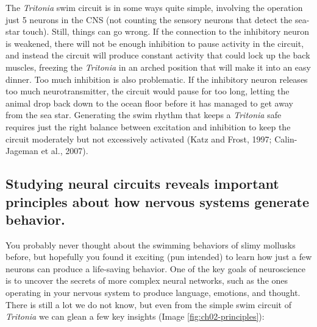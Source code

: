 \documentclass[
]{book}
\begin{document}
The \emph{Tritonia} swim circuit is in some ways quite simple, involving the operation just 5 neurons in the CNS (not counting the sensory neurons that detect the sea-star touch). Still, things can go wrong. If the connection to the inhibitory neuron is weakened, there will not be enough inhibition to pause activity in the circuit, and instead the circuit will produce constant activity that could lock up the back muscles, freezing the \emph{Tritonia} in an arched position that will make it into an easy dinner. Too much inhibition is also problematic. If the inhibitory neuron releases too much neurotransmitter, the circuit would pause for too long, letting the animal drop back down to the ocean floor before it has managed to get away from the sea star. Generating the swim rhythm that keeps a \emph{Tritonia} safe requires just the right balance between excitation and inhibition to keep the circuit moderately but not excessively activated (Katz and Frost, 1997; Calin-Jageman et al., 2007).

\hypertarget{studying-neural-circuits-reveals-important-principles-about-how-nervous-systems-generate-behavior.}{%
\subsection{Studying neural circuits reveals important principles about how nervous systems generate behavior.}\label{studying-neural-circuits-reveals-important-principles-about-how-nervous-systems-generate-behavior.}}

You probably never thought about the swimming behaviors of slimy mollusks before, but hopefully you found it exciting (pun intended) to learn how just a few neurons can produce a life-saving behavior. One of the key goals of neuroscience is to uncover the secrets of more complex neural networks, such as the ones operating in your nervous system to produce language, emotions, and thought. There is still a lot we do not know, but even from the simple swim circuit of \emph{Tritonia} we can glean a few key insights (Image \ref{fig:ch02-principles}):
\end{document}
